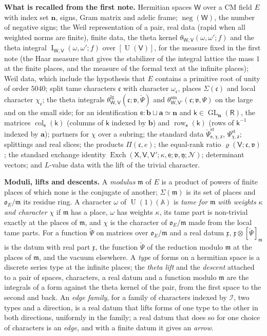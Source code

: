 \documentclass[11pt,a4paper]{article}
\newcommand{\kw}[1]{\emph{#1}}
\newcommand{\subhead}[1]{\par\addvspace{9pt plus 2pt}\Needspace{4\baselineskip}\noindent\textbf{#1}\enspace\ignorespaces}
\theoremstyle{plainx}
\theoremstyle{uprightx}
\newcommand{\dL}{\check{\Psi}}         %
\newcommand{\dS}{\Psi}
\newcommand{\sR}{\mathsf{R}}
\newcommand{\ba}{\mathbf{a}}
\newcommand{\bb}{\mathbf{b}}
\newcommand{\bn}{\mathbf{n}}
\newcommand{\sW}{\mathsf{W}}
\newcommand{\sV}{\mathsf{V}}
\newcommand{\sX}{\mathsf{X}}
\newcommand{\se}{\mathsf{e}}
\newcommand{\sk}{\mathsf{k}}
\newcommand{\sz}{\mathsf{z}}
\newcommand{\fc}{\mathfrak{c}}
\newcommand{\fm}{\mathfrak{m}}
\newcommand{\fv}{\mathfrak{v}}
\newcommand{\fx}{\mathfrak{x}}
\newcommand{\fy}{\mathfrak{y}}
\newcommand{\A}{\mathbb{A}}
\newcommand{\GL}{\operatorname{GL}}
\newcommand{\U}{\operatorname{U}}
\newcommand{\cI}{\mathcal{I}}
\newcommand{\cO}{\mathfrak{o}}
\newcommand{\rowk}[2]{\operatorname{row}_{#1}(#2)}
\newcommand{\colk}[2]{\operatorname{col}_{#1}(#2)}
\newcommand{\stc}[2]{\dS^{\mathrm{st}}_{#1,#2}}
\newcommand{\str}[3]{\dL^{\mathrm{st}}_{#1,#2,#3}}
\newcommand{\thL}[5]{\theta^{\mathrm{lg}}_{#1,#2}(#3;#4,#5)}
\newcommand{\thS}[5]{\theta^{\mathrm{sm}}_{#1,#2}(#3;#4,#5)}
\newcommand{\thI}[5]{\operatorname{I}_{#1,#2}(#3,#4;#5)}
\newcommand{\eqr}[3]{\varrho(#1;#2,#3)}
\newcommand{\Exch}[8]{\operatorname{Exch}(#1,#2,#3;#4,#5;#6,#7;#8)}
\newcommand{\LP}[2]{\Pi(#1,#2)}
\newcommand{\negc}{\operatorname{neg}}
\newcommand{\md}[3]{#1\otimes[#2]_{#3}}
\begin{document}
\subhead{What is recalled from the first note.} Hermitian spaces $\sW$ over a CM field $E$ with index set $\bn$,
signs, Gram matrix and adelic frame; $\negc(\sW)$, the number of negative signs; the Weil representation of a
pair, real data (rapid when all weighted norms are finite), finite data, the theta kernel
$\theta_{\sW,\sV}(\omega,\omega';f)$ and the theta integral $\thI{\sW}{\sV}{\omega}{\omega'}{f}$ over $[\U(\sV)]$,
for the measure fixed in the first note (the Haar measure that gives the stabilizer of the integral lattice the
mass $1$ at the finite places, and the measure of the formal text at the infinite places); Weil data, which
include the hypothesis that $E$ contains a primitive root of unity of order $5040$;
split tame characters $\fc$ with character $\omega_{\fc}$, places $\Sigma(\fc)$ and local character $\chi_{\fc}$;
the theta integrals $\thL{\sW}{\sV}{\fc}{\fv}{\dL}$ and $\thS{\sW}{\sV'}{\fc}{\fv}{\dS}$ on the large and on the
small side; for an identification $\se\colon\bb\sqcup\ba\simeq\bn$ and $\sk\in\GL_{\bn}(\sR)$, the matrices
$\colk{\se}{\sk}$ (columns of $\sk$ indexed by $\bb$) and $\rowk{\se}{\sk}$ (rows of $\sk^{-1}$ indexed by $\ba$);
partners for $\chi$ over a subring; the standard data $\str{\se}{\chi}{\sz}$, $\stc{\chi}{\sz}$; splittings and
real slices; the products $\LP{\fc}{e}$; the equal-rank ratio $\eqr{\sV}{\fc}{\fv}$; the standard exchange identity
$\Exch{\sX}{\sV}{\sV'}{\kappa}{\se}{\fv}{\fy}{\mathcal{N}}$; determinant vectors; and $L$-value data with the lift of the trivial character.

\subhead{Moduli, lifts and descents.} A \kw{modulus} $\fm$ of $E$ is a product of powers of finite
places of which none is the conjugate of another; $\Sigma(\fm)$ is its set of places and $\cO_E/\fm$ its residue
ring. A character $\omega$ of $\U(1)(\A)$ is \kw{tame for} $\fm$ \kw{with weights} $\kappa$ \kw{and character}
$\chi$ if $\fm$ has a place, $\omega$ has weights $\kappa$, its tame part is non-trivial exactly at the places of
$\fm$, and $\chi$ is the character of $\cO_E/\fm$ made from the local tame parts. For a function $\dL$ on matrices
over $\cO_E/\fm$ and a real datum $\fx$, $\md{\fx}{\dL}{\fm}$ is the datum with real part $\fx$, the function
$\dL$ of the reduction modulo $\fm$ at the places of $\fm$, and the vacuum elsewhere. A \kw{type} of forms on a
hermitian space is a discrete series type at the infinite places; the \kw{theta lift} and the \kw{descent}
attached to a pair of spaces, characters, a real datum and a function modulo $\fm$ are the integrals of a form
against the theta kernel of the pair, from the first space to the second and back. An \kw{edge family}, for a
family of characters indexed by $\cI$, two types and a direction, is a real datum that lifts forms of one type
to the other in both directions, uniformly in the family; a real datum that does so for one choice of characters
is an \kw{edge}, and with a finite datum it gives an \kw{arrow}.
\end{document}
